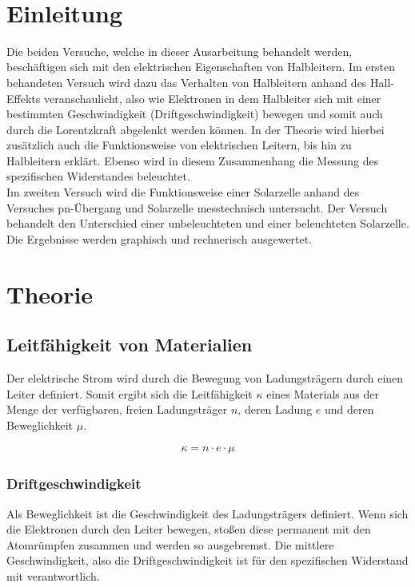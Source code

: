 \documentclass[a4paper]{scrartcl}
\def\header#1#2{
  \begin{center}
    {\Large #1}\\
    {#2}
  \end{center}
}
\numberwithin{equation}{subsection}
\begin{document}
\vspace{2cm}
\header{\HEADDING}{\SUBHEADDING}

\vspace{2cm}

\tableofcontents

\newpage

\section{Einleitung}
Die beiden Versuche, welche in dieser Ausarbeitung behandelt werden, beschäftigen sich mit den elektrischen Eigenschaften von Halbleitern. Im ersten behandeten Versuch wird dazu das Verhalten von Halbleitern anhand des Hall-Effekts veranschaulicht, also wie Elektronen in dem Halbleiter sich mit einer bestimmten Geschwindigkeit (Driftgeschwindigkeit) bewegen und somit auch durch die Lorentzkraft abgelenkt werden können. In der Theorie wird hierbei zusätzlich auch die Funktionsweise von elektrischen Leitern, bis hin zu Halbleitern erklärt.
Ebenso wird in diesem Zusammenhang die Messung des spezifischen Widerstandes beleuchtet.
\\
Im zweiten Versuch wird die Funktionsweise einer Solarzelle anhand des Versuches
\glqq pn-Übergang und Solarzelle\grqq \hspace{0cm} messtechnisch untersucht. Der Versuch behandelt
den Unterschied einer unbeleuchteten und einer beleuchteten Solarzelle. Die Ergebnisse werden graphisch
und rechnerisch ausgewertet.


\newpage

\section{Theorie}
\subsection{Leitfähigkeit von Materialien}
Der elektrische Strom wird durch die Bewegung von Ladungsträgern durch einen Leiter definiert.
Somit ergibt sich die Leitfähigkeit $\kappa$ eines Materials aus der Menge der verfügbaren, freien Ladungsträger $n$, deren Ladung $e$ und deren Beweglichkeit $\mu$. \cite{horn}

\begin{align}
\kappa = n \cdot e \cdot \mu
\end{align}

\subsubsection{Driftgeschwindigkeit}
Als Beweglichkeit ist die Geschwindigkeit des Ladungsträgers definiert. Wenn sich die Elektronen durch den Leiter bewegen, stoßen diese permanent mit den Atomrümpfen zusammen und werden so ausgebremst. Die mittlere Geschwindigkeit, also die Driftgeschwindigkeit ist für den spezifischen Widerstand mit verantwortlich. \cite{werk}
\end{document}
